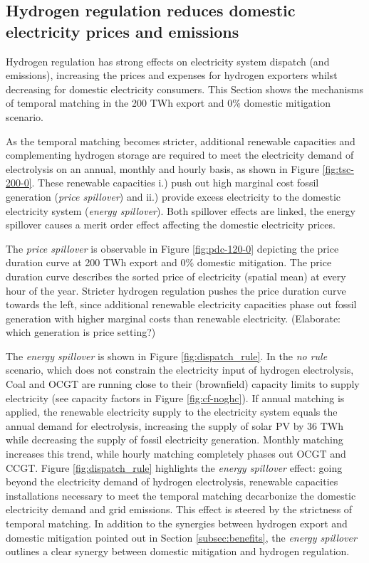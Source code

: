 \subsection{Hydrogen regulation reduces domestic electricity prices and emissions}
\label{subsec:benefits_rule}

Hydrogen regulation has strong effects on electricity system dispatch (and emissions), increasing the prices and expenses for hydrogen exporters whilst decreasing for domestic electricity consumers. This Section shows the mechanisms of temporal matching in the 200 TWh export and 0\% domestic mitigation scenario.

As the temporal matching becomes stricter, additional renewable capacities and complementing hydrogen storage are required to meet the electricity demand of electrolysis on an annual, monthly and hourly basis, as shown in Figure \ref{fig:tsc-200-0}. These renewable capacities i.) push out high marginal cost fossil generation (\textit{price spillover}) and ii.) provide excess electricity to the domestic electricity system (\textit{energy spillover}). Both spillover effects are linked, the energy spillover causes a merit order effect affecting the domestic electricity prices.

The \textit{price spillover} is observable in Figure \ref{fig:pdc-120-0} depicting the price duration curve at 200 TWh export and 0\% domestic mitigation. The price duration curve describes the sorted price of electricity (spatial mean) at every hour of the year.
Stricter hydrogen regulation pushes the price duration curve towards the left, since additional renewable electricity capacities phase out fossil generation with higher marginal costs than renewable electricity. (Elaborate: which generation is price setting?)


The \textit{energy spillover} is shown in Figure \ref{fig:dispatch_rule}. In the \textit{no rule} scenario, which does not constrain the electricity input of hydrogen electrolysis, Coal and OCGT are running close to their (brownfield) capacity limits to supply electricity (see capacity factors in Figure \ref{fig:cf-noghc}). If annual matching is applied, the renewable electricity supply to the electricity system equals the annual demand for electrolysis, increasing the supply of solar PV by 36 TWh while decreasing the supply of fossil electricity generation. 
Monthly matching increases this trend, while hourly matching completely phases out OCGT and CCGT. Figure \ref{fig:dispatch_rule} highlights the \textit{energy spillover} effect: going beyond the electricity demand of hydrogen electrolysis, renewable capacities installations necessary to meet the temporal matching decarbonize the domestic electricity demand and grid emissions. This effect is steered by the strictness of temporal matching.
In addition to the synergies between hydrogen export and domestic mitigation pointed out in Section \ref{subsec:benefits}, the \textit{energy spillover} outlines a clear synergy between domestic mitigation and hydrogen regulation.



